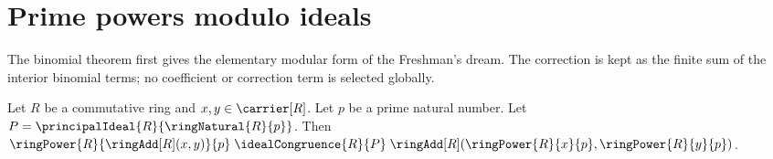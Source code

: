 




\section{Prime powers modulo ideals}

The binomial theorem first gives the elementary modular form of the
Freshman's dream.  The correction is kept as the finite sum of the interior
binomial terms; no coefficient or correction term is selected globally.

\begin{theorem}\label{freshmans_dream_mod_principal_ideal}
    Let $R$ be a commutative ring and $x,y\in\carrier[R]$.
    Let $p$ be a prime natural number.
    Let $P=\principalIdeal{R}{\ringNatural{R}{p}}$.
    Then
        $\ringPower{R}{\ringAdd[R](x,y)}{p}
            \mathrel{\idealCongruence{R}{P}}
        \ringAdd[R](\ringPower{R}{x}{p},\ringPower{R}{y}{p})$.
\end{theorem}
